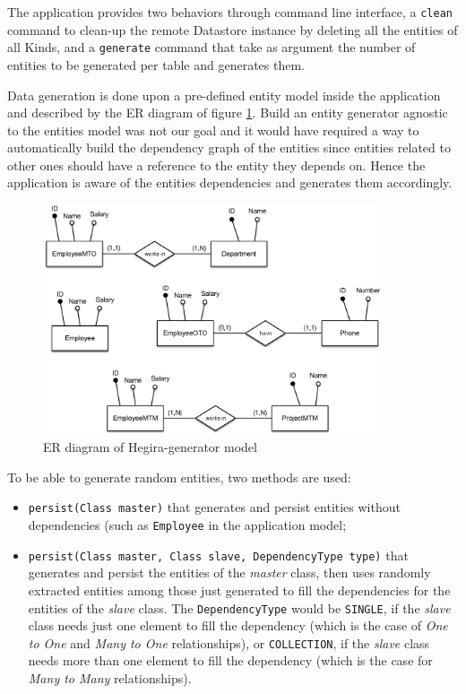 \noindent The application provides two behaviors through command line interface, a \texttt{clean} command to clean-up the remote Datastore instance by deleting all the entities of all Kinds, and a \texttt{generate} command that take as argument the number of entities to be generated per table and generates them.

\newparagraph Data generation is done upon a pre-defined entity model inside the application and described by the ER diagram of figure \ref{fig:hegira-generator-er}.
Build an entity generator agnostic to the entities model was not our goal and it would have required a way to automatically build the dependency graph of the entities since entities related to other ones should have a reference to the entity they depends on. Hence the application is aware of the entities dependencies and generates them accordingly.

\begin{figure}[tbh]
  \centering
  \includegraphics[width=10cm]{images/hegira_generator_er}
  \caption{ER diagram of Hegira-generator model}
  \label{fig:hegira-generator-er}
\end{figure} 

\noindent To be able to generate random entities, two methods are used:
\begin{itemize}
\item \texttt{persist(Class master)} that generates and persist entities without dependencies (such as \texttt{Employee} in the application model;
\item \texttt{persist(Class master, Class slave, DependencyType type)} that generates and persist the entities of the \textit{master} class, then uses randomly extracted entities among those just generated to fill the dependencies for the entities of the \textit{slave} class.
The \texttt{DependencyType} would be \texttt{SINGLE}, if the \textit{slave} class needs just one element to fill the dependency (which is the case of \textit{One to One} and \textit{Many to One} relationships), or \texttt{COLLECTION}, if the \textit{slave} class needs more than one element to fill the dependency (which is the case for \textit{Many to Many} relationships).
\end{itemize}

